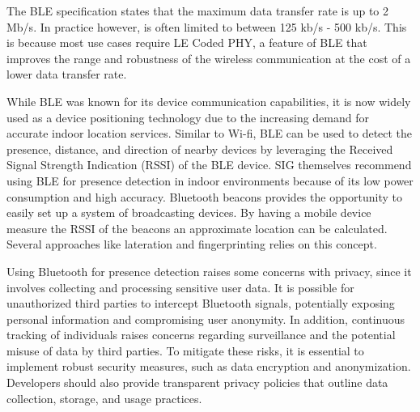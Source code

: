 The BLE specification states that the maximum data transfer rate is up to 2 Mb/s.
In practice however, is often limited to between 125 kb/s - 500 kb/s.
This is because most use cases require LE Coded PHY, a feature of BLE that improves the range and robustness of the wireless communication at the cost of a lower data transfer rate.\cite{BluetoothOverview}\cite{BLE_Regulatory_Aspects_Document}

While BLE was known for its device communication capabilities, it is now widely used as a device positioning technology due to the increasing demand for accurate indoor location services.
Similar to Wi-fi, BLE can be used to detect the presence, distance, and direction of nearby devices by leveraging the Received Signal Strength Indication (RSSI) of the BLE device.
SIG themselves recommend using BLE for presence detection in indoor environments because of its low power consumption and high accuracy.\cite{BluetoothOverview}\cite{BLE_Regulatory_Aspects_Document}
Bluetooth beacons provides the opportunity to easily set up a system of broadcasting devices.
By having a mobile device measure the RSSI of the beacons an approximate location can be calculated.
Several approaches like lateration\cite{rssi_indoor_pos,presence_ble_review} and fingerprinting\cite{taking_localization_to_the_wild} relies on this concept.  

Using Bluetooth for presence detection raises some concerns with privacy, since it involves collecting and processing sensitive user data.
It is possible for unauthorized third parties to intercept Bluetooth signals, potentially exposing personal information and compromising user anonymity.
In addition, continuous tracking of individuals raises concerns regarding surveillance and the potential misuse of data by third parties. 
To mitigate these risks, it is essential to implement robust security measures, such as data encryption and anonymization.
Developers should also provide transparent privacy policies that outline data collection, storage, and usage practices.\cite{BluetoothPrivacy,BLE_Security}